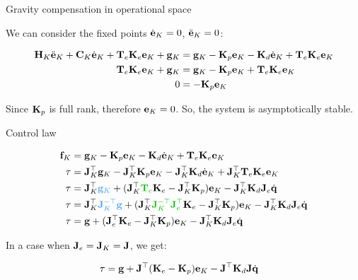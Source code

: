 \documentclass{beamer}
\begin{document}
\begin{frame}{Gravity compensation in operational space}
	\begin{flushleft}
		
		We can consider the fixed points $\dot{\mathbf{e}}_K = 0$, $\ddot{\mathbf{e}}_K = 0$:
		
		\begin{align*}
			\mathbf{H}_K \ddot{\mathbf{e}}_K + \mathbf{C}_K \dot{\mathbf{e}}_K +
			\mathbf{T}_e \mathbf{K}_e \mathbf{e}_K	+
			\mathbf{g} _K
			&=  
			\mathbf{g} _K - \mathbf{K}_p \mathbf{e}_K - \mathbf{K}_d \dot{\mathbf{e}}_K + \mathbf{T}_e \mathbf{K}_e \mathbf{e}_K
			\\
			\mathbf{T}_e \mathbf{K}_e \mathbf{e}_K	+
			\mathbf{g} _K
			&=  
			\mathbf{g} _K - \mathbf{K}_p \mathbf{e}_K + \mathbf{T}_e \mathbf{K}_e \mathbf{e}_K
			\\
			0 &=  
			- \mathbf{K}_p \mathbf{e}_K
		\end{align*}		
	
	Since $\mathbf{K}_p$ is full rank, therefore $ \mathbf{e}_K = 0$. So, the system is asymptotically stable.
		
	\end{flushleft}
\end{frame}


\begin{frame}{Control law}
	\begin{flushleft}
		
		\begin{align}
			\bo{f}_K &= \bo{g} _K - \bo{K}_p \bo{e}_K - \bo{K}_d \dot{\bo{e}}_K + \bo{T}_e \bo{K}_e \bo{e}_K
			\\
			\tau &= \bo{J}_K\T \bo{g} _K - 
			                   \bo{J}_K\T\bo{K}_p \bo{e}_K - 
			                   \bo{J}_K\T\bo{K}_d \dot{\bo{e}}_K + 
			\bo{J}_K\T\bo{T}_e \bo{K}_e \bo{e}_K 
			\\
			\tau &= \bo{J}_K\T \textcolor{mydarkblue}{\bo{g} _K} + 
			(\bo{J}_K\T \textcolor{mygreen}{\bo{T}_e} \bo{K}_e  - \bo{J}_K\T\bo{K}_p) \bo{e}_K - 
			\bo{J}_K\T\bo{K}_d \bo{J}_e \dot{\bo{q}}
			\\
			\tau &= \bo{J}_K\T \textcolor{mydarkblue}{\bo{J}_K^{-\top}\bo{g}} + 
			(\bo{J}_K\T \textcolor{mygreen}{\bo{J}_K^{-\top}\bo{J}_e\T}  \bo{K}_e  - \bo{J}_K\T\bo{K}_p) \bo{e}_K - 
			\bo{J}_K\T\bo{K}_d \bo{J}_e \dot{\bo{q}}
			\\
			\tau &= \bo{g} + 
			(\bo{J}_e\T  \bo{K}_e  - \bo{J}_K\T\bo{K}_p) \bo{e}_K - 
			\bo{J}_K\T\bo{K}_d \bo{J}_e \dot{\bo{q}}
		\end{align}
		
		In a case when $\mathbf{J}_e = \mathbf{J}_K = \mathbf{J}$, we get:
		
		\begin{align}
			\tau &= \mathbf{g} + 
			\mathbf{J}^\top  (\mathbf{K}_e  - \mathbf{K}_p) \mathbf{e}_K - 
			\mathbf{J}^\top\mathbf{K}_d \mathbf{J} \dot{\mathbf{q}}
		\end{align}
		
		
		
	\end{flushleft}
\end{frame}
\end{document}
